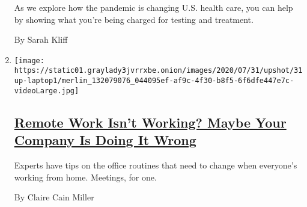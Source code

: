 \begin{enumerate}
  As we explore how the pandemic is changing U.S. health care, you can
  help by showing what you're being charged for testing and treatment.

  By Sarah Kliff
\item
  \texttt{[image: https://static01.graylady3jvrrxbe.onion/images/2020/07/31/upshot/31up-laptop1/merlin\_132079076\_044095ef-af9c-4f30-b8f5-6f6dfe447e7c-videoLarge.jpg]}

  \hypertarget{remote-work-isnt-working-maybe-your-company-is-doing-it-wrong}{%
  \subsection{\texorpdfstring{\href{/2020/07/31/upshot/remote-work-tips.html}{Remote
  Work Isn't Working? Maybe Your Company Is Doing It
  Wrong}}{Remote Work Isn't Working? Maybe Your Company Is Doing It Wrong}}\label{remote-work-isnt-working-maybe-your-company-is-doing-it-wrong}}

  Experts have tips on the office routines that need to change when
  everyone's working from home. Meetings, for one.

  By Claire Cain Miller
\end{enumerate}

